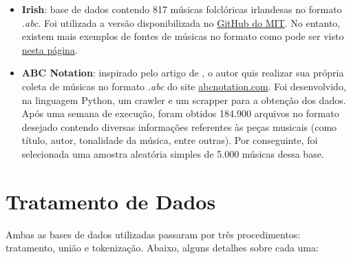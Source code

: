 \documentclass{automatextcc}
\begin{document}
\begin{itemize}
    \item \textbf{Irish}: base de dados contendo 817 músicas folclóricas irlandesas no formato \textit{.abc}. Foi utilizada a versão disponibilizada no \href{https://github.com/aamini/introtodeeplearning/blob/master/mitdeeplearning/data/irish.abc}{GitHub do MIT}. No entanto, existem mais exemplos de fontes de músicas no formato como pode ser visto \href{https://www.norbeck.nu/abc/links.asp}{nesta página}. 
    \item \textbf{ABC Notation}: inspirado pelo artigo de \citet{agarwala2017}, o autor quis realizar sua própria coleta de músicas no formato \textit{.abc} do site \href{https://abcnotation.com/}{abcnotation.com}. Foi desenvolvido, na linguagem Python, um crawler e um scrapper para a obtenção dos dados. Após uma semana de execução, foram obtidos 184.900 arquivos no formato desejado contendo diversas informações referentes às peças musicais (como título, autor, tonalidade da música, entre outras). Por conseguinte, foi selecionada uma amostra aleatória simples de 5.000 músicas dessa base.
\end{itemize}




\section{Tratamento de Dados}



Ambas as bases de dados utilizadas passaram por três procedimentos: tratamento, união e tokenização. Abaixo, alguns detalhes sobre cada uma:
\end{document}
